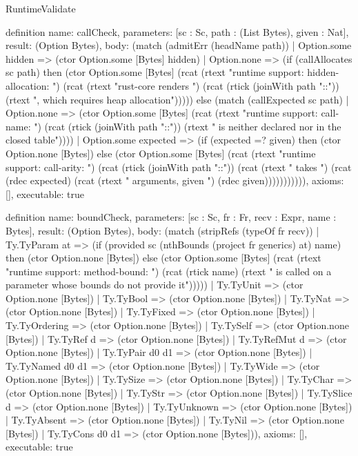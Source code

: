 \begin{lexlean}{RuntimeValidate}
\begin{semanticmodule}
definition{
  name: callCheck,
  parameters: [sc : Sc, path : (List Bytes), given : Nat],
  result: (Option Bytes),
  body: (match (admitErr (headName path))
    | Option.some hidden => (ctor Option.some [Bytes] hidden)
    | Option.none => (if (callAllocates sc path) then (ctor Option.some [Bytes] (rcat (rtext "runtime support: hidden-allocation: ") (rcat (rtext "rust-core renders ") (rcat (rtick (joinWith path "::")) (rtext ", which requires heap allocation"))))) else (match (callExpected sc path)
      | Option.none => (ctor Option.some [Bytes] (rcat (rtext "runtime support: call-name: ") (rcat (rtick (joinWith path "::")) (rtext " is neither declared nor in the closed table"))))
      | Option.some expected => (if (expected =? given) then (ctor Option.none [Bytes]) else (ctor Option.some [Bytes] (rcat (rtext "runtime support: call-arity: ") (rcat (rtick (joinWith path "::")) (rcat (rtext " takes ") (rcat (rdec expected) (rcat (rtext " arguments, given ") (rdec given))))))))))),
  axioms: [],
  executable: true
}

definition{
  name: boundCheck,
  parameters: [sc : Sc, fr : Fr, recv : Expr, name : Bytes],
  result: (Option Bytes),
  body: (match (stripRefs (typeOf fr recv))
    | Ty.TyParam at => (if (provided sc (nthBounds (project fr generics) at) name) then (ctor Option.none [Bytes]) else (ctor Option.some [Bytes] (rcat (rtext "runtime support: method-bound: ") (rcat (rtick name) (rtext " is called on a parameter whose bounds do not provide it")))))
    | Ty.TyUnit => (ctor Option.none [Bytes])
    | Ty.TyBool => (ctor Option.none [Bytes])
    | Ty.TyNat => (ctor Option.none [Bytes])
    | Ty.TyFixed => (ctor Option.none [Bytes])
    | Ty.TyOrdering => (ctor Option.none [Bytes])
    | Ty.TySelf => (ctor Option.none [Bytes])
    | Ty.TyRef d => (ctor Option.none [Bytes])
    | Ty.TyRefMut d => (ctor Option.none [Bytes])
    | Ty.TyPair d0 d1 => (ctor Option.none [Bytes])
    | Ty.TyNamed d0 d1 => (ctor Option.none [Bytes])
    | Ty.TyWide => (ctor Option.none [Bytes])
    | Ty.TySize => (ctor Option.none [Bytes])
    | Ty.TyChar => (ctor Option.none [Bytes])
    | Ty.TyStr => (ctor Option.none [Bytes])
    | Ty.TySlice d => (ctor Option.none [Bytes])
    | Ty.TyUnknown => (ctor Option.none [Bytes])
    | Ty.TyAbsent => (ctor Option.none [Bytes])
    | Ty.TyNil => (ctor Option.none [Bytes])
    | Ty.TyCons d0 d1 => (ctor Option.none [Bytes])),
  axioms: [],
  executable: true
}


\end{semanticmodule}
\end{lexlean}
